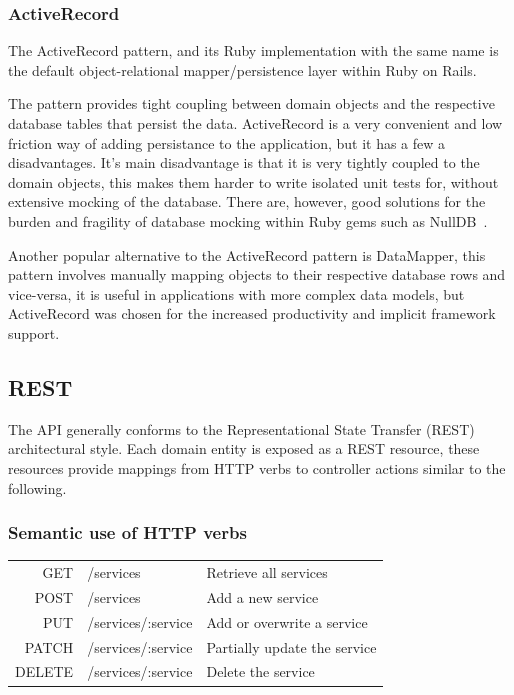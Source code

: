 \documentclass{cshonours}
\begin{document}
\subsubsection{ActiveRecord}

The ActiveRecord\cite{ActiveRecord} pattern, and its Ruby implementation with the same name is the default object-relational mapper/persistence layer within Ruby on Rails.

The pattern provides tight coupling between domain objects and the respective database tables that persist the data. ActiveRecord is a very convenient and low friction way of adding persistance to the application, but it has a few a disadvantages. It's main disadvantage is that it is very tightly coupled to the domain objects, this makes them harder to write isolated unit tests for, without extensive mocking of the database. There are, however, good solutions for the burden and fragility of database mocking within Ruby gems such as NullDB~\cite{NullDB}.

Another popular alternative to the ActiveRecord pattern is DataMapper\cite{DataMapper}, this pattern involves manually mapping objects to their respective database rows and vice-versa, it is useful in applications with more complex data models, but ActiveRecord was chosen for the increased productivity and implicit framework support.

\subsection{REST}

The API generally conforms to the Representational State Transfer (REST) architectural style. Each domain entity is exposed as a REST resource, these resources provide mappings from HTTP verbs to controller actions similar to the following.

\subsubsection{Semantic use of HTTP verbs}

\begin{table}[h]
  \centering
\begin{tabular}{r|l|l|}
  GET & /services & Retrieve all services \\
  POST & /services & Add a new service \\
  PUT & /services/:service & Add or overwrite a service \\
  PATCH & /services/:service & Partially update the service \\
  DELETE & /services/:service & Delete the service \\
\end{tabular}
\end{table}
\end{document}
